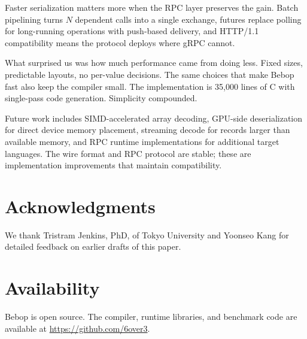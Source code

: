 \documentclass[10pt,onecolumn]{article}
\begin{document}
Faster serialization matters more when the RPC layer preserves the gain. Batch pipelining turns $N$ dependent calls into a single exchange, futures replace polling for long-running operations with push-based delivery, and HTTP/1.1 compatibility means the protocol deploys where gRPC cannot.

What surprised us was how much performance came from doing less. Fixed sizes, predictable layouts, no per-value decisions. The same choices that make Bebop fast also keep the compiler small. The implementation is 35,000 lines of C with single-pass code generation. Simplicity compounded.

Future work includes SIMD-accelerated array decoding, GPU-side deserialization for direct device memory placement, streaming decode for records larger than available memory, and RPC runtime implementations for additional target languages. The wire format and RPC protocol are stable; these are implementation improvements that maintain compatibility.

\section*{Acknowledgments}

We thank Tristram Jenkins, PhD, of Tokyo University and Yoonseo Kang for detailed feedback on earlier drafts of this paper.

\section*{Availability}

Bebop is open source. The compiler, runtime libraries, and benchmark code are available at \url{https://github.com/6over3}.


\newpage
\end{document}
